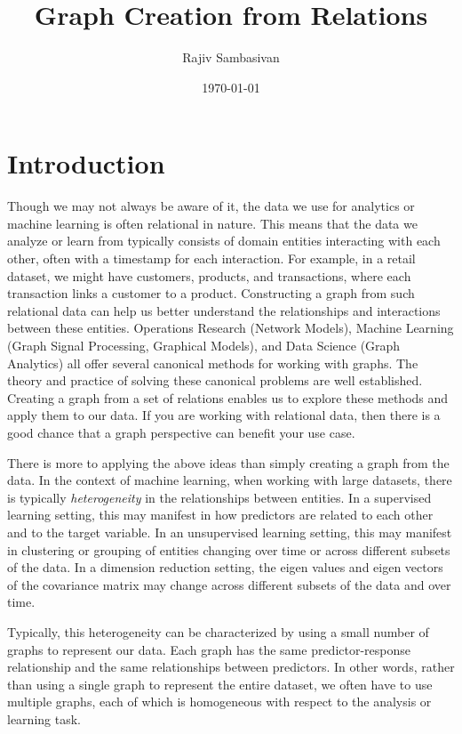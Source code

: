 \documentclass{article}
\title{Graph Creation from Relations}
\author{Rajiv Sambasivan}
\date{\today}
\begin{document}
\sloppy

\maketitle

\section{Introduction}
Though we may not always be aware of it, the data we use for analytics or machine learning is often relational in nature. This means that the data we analyze or learn from typically consists of domain entities interacting with each other, often with a timestamp for each interaction. For example, in a retail dataset, we might have customers, products, and transactions, where each transaction links a customer to a product. Constructing a graph from such relational data can help us better understand the relationships and interactions between these entities. Operations Research (Network Models), Machine Learning (Graph Signal Processing, Graphical Models), and Data Science (Graph Analytics) all offer several canonical methods for working with graphs. The theory and practice of solving these canonical problems are well established. Creating a graph from a set of relations enables us to explore these methods and apply them to our data.  If you are working with relational data, then there is a good chance that a graph perspective can benefit your use case.

There is more to applying the above ideas than simply creating a graph from the data. In the context of machine learning, when working with large datasets, there is typically \emph{heterogeneity} in the relationships between entities. In a supervised learning setting, this may manifest in how predictors are related to each other and to the target variable. In an unsupervised learning setting, this may manifest in clustering or grouping of entities changing over time or across different subsets of the data. In a dimension reduction setting, the eigen values and eigen vectors of the covariance matrix may change across different subsets of the data and over time.

Typically, this heterogeneity can be characterized by using a small number of graphs to represent our data. Each graph has the same predictor-response relationship and the same relationships between predictors. In other words, rather than using a single graph to represent the entire dataset, we often have to use multiple graphs, each of which is homogeneous with respect to the analysis or learning task.
\end{document}
